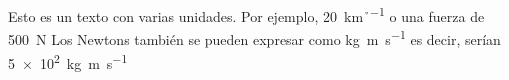 Esto es un texto con varias unidades. Por ejemplo, \SI{20}{\km\per\h} o
una fuerza de \SI{500}{\N} Los Newtons también se pueden expresar como
\si{\kg\m\per\s} es decir, serían \SI{5e2}{\kg\m\per\s}
